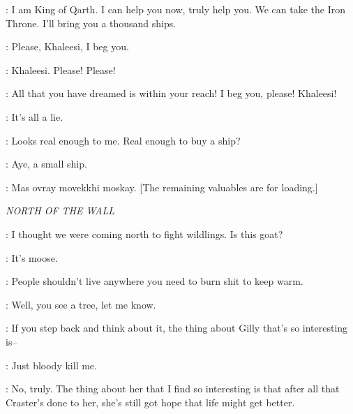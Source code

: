 \XARO: I am King of Qarth. I can help you now, truly help you.  We can take the Iron Throne. I'll bring you a thousand ships. 

\DOREAH:  Please, Khaleesi, I beg you. 


\DOREAH: Khaleesi. Please! Please! 

\XARO: All that you have dreamed is within your reach! I beg you, please!  Khaleesi! 


\JORAH: It's all a lie. 

\DAENERYS: Looks real enough to me.  Real enough to buy a ship? 

\JORAH: Aye, a small ship. 


\JORAH:  Mas ovray movekkhi moskay. [The remaining valuables are for loading.] 



\scene

\textit{NORTH OF THE WALL} 


\GRENN: I thought we were coming north to fight wildlings.  Is this goat? 

\EDD: It's moose.  

\GRENN: People shouldn't live anywhere you need to burn shit to keep warm. 

\EDD: Well, you see a tree, let me know. 

\SAM: If you step back and think about it, the thing about Gilly that's so interesting is--  

\EDD:  Just bloody kill me. 


\SAM: No, truly. The thing about her that I find so interesting is that after all that Craster's done to her, she's still got hope that life might get better. 

